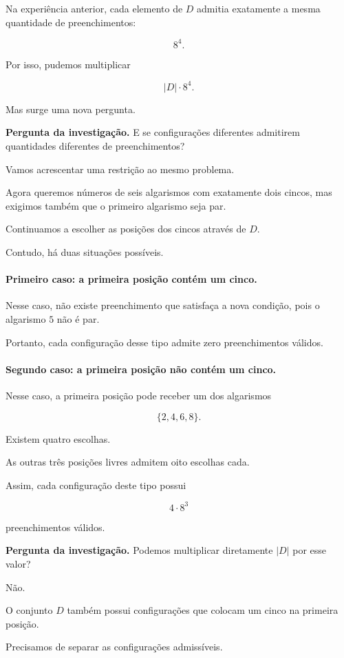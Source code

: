 \documentclass[11pt,a4paper,oneside]{book}
\newcommand{\Pergunta}[1]{\begin{perguntabox}\textbf{Pergunta da investigação.} #1\end{perguntabox}}
\newcommand{\card}[1]{\lvert #1\rvert}
\begin{document}
Na experiência anterior,
cada elemento de $D$ admitia
exatamente a mesma quantidade
de preenchimentos:

\[
8^4.
\]

Por isso, pudemos multiplicar

\[
\card D\cdot8^4.
\]

Mas surge uma nova pergunta.

\Pergunta{E se configurações diferentes
admitirem quantidades diferentes
de preenchimentos?}

Vamos acrescentar uma restrição
ao mesmo problema.

Agora queremos números de seis algarismos
com exatamente dois cincos,
mas exigimos também que
o primeiro algarismo seja par.

Continuamos a escolher as posições
dos cincos através de $D$.

Contudo, há duas situações possíveis.

\paragraph{Primeiro caso: a primeira posição
contém um cinco.}

Nesse caso, não existe preenchimento
que satisfaça a nova condição,
pois o algarismo $5$ não é par.

Portanto, cada configuração desse tipo
admite zero preenchimentos válidos.

\paragraph{Segundo caso: a primeira posição
não contém um cinco.}

Nesse caso, a primeira posição
pode receber um dos algarismos

\[
\{2,4,6,8\}.
\]

Existem quatro escolhas.

As outras três posições livres
admitem oito escolhas cada.

Assim, cada configuração deste tipo
possui

\[
4\cdot8^3
\]

preenchimentos válidos.

\Pergunta{Podemos multiplicar
diretamente $\card D$ por esse valor?}

Não.

O conjunto $D$ também possui
configurações que colocam
um cinco na primeira posição.

Precisamos de separar
as configurações admissíveis.
\end{document}
